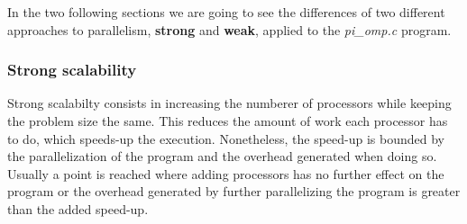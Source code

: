 \documentclass[12]{article}
\begin{document}
In the two following sections we are going to see the differences of two different approaches to parallelism, \textbf{strong} and \textbf{weak}, applied to the \textit{pi\_omp.c} program.

\subsubsection{Strong scalability}

Strong scalabilty consists in increasing the numberer of processors while keeping the problem size the same. This reduces the amount of work each processor has to do, which speeds-up the execution.
Nonetheless, the speed-up is bounded by the parallelization of the program and the overhead generated when doing so. Usually a point is reached where adding processors has no further effect on the program or the overhead generated by further parallelizing the program is greater than the added speed-up. 
\end{document}
